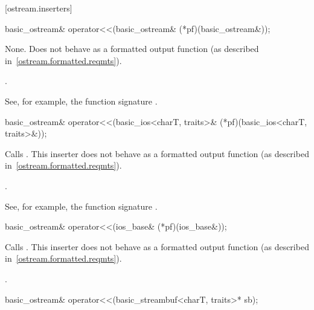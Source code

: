 [ostream.inserters]{}

%
\begin{itemdecl}
basic_ostream& operator<<(basic_ostream& (*pf)(basic_ostream&));
\end{itemdecl}

\begin{itemdescr}
\pnum
\effects
None.
Does not behave as a formatted output function (as described
in~\ref{ostream.formatted.reqmts}).

\pnum
\returns
{}.
\begin{footnote}
See, for example, the function signature
%
.
\end{footnote}
\end{itemdescr}

%
\begin{itemdecl}
basic_ostream& operator<<(basic_ios<charT, traits>& (*pf)(basic_ios<charT, traits>&));
\end{itemdecl}

\begin{itemdescr}
\pnum
\effects
Calls
.
This inserter does not
behave as a formatted output function (as described in~\ref{ostream.formatted.reqmts}).

\pnum
\returns
{}.
\begin{footnote}
See, for example, the function signature
%
.
\end{footnote}
\end{itemdescr}

%
\begin{itemdecl}
basic_ostream& operator<<(ios_base& (*pf)(ios_base&));
\end{itemdecl}

\begin{itemdescr}
\pnum
\effects
Calls
.
This inserter does not
behave as a formatted output function (as described in~\ref{ostream.formatted.reqmts}).

\pnum
\returns
{}.
\end{itemdescr}

%
\begin{itemdecl}
basic_ostream& operator<<(basic_streambuf<charT, traits>* sb);
\end{itemdecl}

